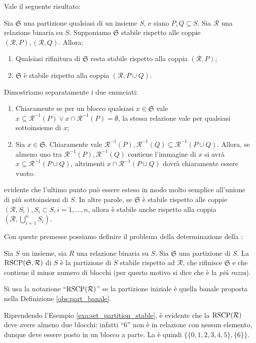 Vale il seguente risultato:
\begin{proposition}
    \label{prop:rifi_stabile}
    Sia $\mathfrak{S}$ una partizione qualsiasi di un insieme $S$, e siano $P,Q \subseteq S$. Sia $\mathcal{R}$ una relazione binaria su $S$. Supponiamo $\mathfrak{S}$ stabile rispetto alle coppie $(\mathcal{R},P),(\mathcal{R},Q)$. Allora:
    \begin{enumerate}
        \item Qualsiasi rifinitura di $\mathfrak{S}$ resta stabile rispetto alla coppia $(\mathcal{R},P)$;
        \item $\mathfrak{S}$ è stabile rispetto alla coppia $(\mathcal{R},P \cup Q)$.
    \end{enumerate}
\end{proposition}
\begin{proof2}
    Dimostriamo separatamente i due enunciati:
    \begin{enumerate}
        \item Chiaramente se per un blocco qualsiasi $x \in \mathfrak{S}$ vale $x \subseteq \mathcal{R}^{-1}(P) \lor x \cap \mathcal{R}^{-1}(P) = \emptyset$, la stessa relazione vale per qualsiasi sottoinsieme di $x$;
        \item Sia $x \in \mathfrak{S}$. Chiaramente vale $\mathcal{R}^{-1}(P),\mathcal{R}^{-1}(Q) \subseteq \mathcal{R}^{-1}(P \cup Q)$. Allora, se almeno uno tra $\mathcal{R}^{-1}(P),\mathcal{R}^{-1}(Q)$ contiene l'immagine di $x$ si avrà $x \subseteq \mathcal{R}^{-1}(P \cup Q)$, altrimenti $x \cap \mathcal{R}^{-1}(P \cup Q)$ dovrà chiaramente essere vuoto.
    \end{enumerate}
    \vspace*{-0.75cm}
\end{proof2}

\accente evidente che l'ultimo punto può essere esteso in modo molto semplice all'unione di più sottoinsiemi di $S$. In altre parole, se $\mathfrak{S}$ è stabile rispetto alle coppie $(\mathcal{R},S_i), S_i \subset S, i = 1, \dots, n$, allora è stabile anche rispetto alla coppia $(\mathcal{R}, \bigcup_{i=1}^{n} S_i)$.

Con queste premesse possiamo definire il problema della determinazione della \rscp:
\begin{definition}
    Sia $S$ un insieme, sia $R$ una relazione binaria su $S$. Sia $\mathfrak{S}$ una partizione di $S$. La $\textup{RSCP}(\mathfrak{S},\mathcal{R})$ di $S$ è la partizione di $S$ stabile rispetto ad $\mathcal{R}$, che rifinisce $\mathfrak{S}$ e che contiene il minor numero di blocchi (per questo motivo si dice che è la \emph{più rozza}).

    Si usa la notazione ``$\textup{RSCP}(\mathcal{R})$'' se la partizione iniziale è quella banale proposta nella Definizione \ref{obs:part_banale}.
\end{definition}
\begin{example}
    Riprendendo l'Esempio \ref*{exa:set_partition_stable}, è evidente che la $\textup{RSCP}(\mathcal{R})$ deve avere almeno due blocchi: infatti ``6'' non è in relazione con nessun elemento, dunque deve essere posto in un blocco a parte. La \rscp è quindi $\{\{0,1,2,3,4,5\},\{6\}\}$.
\end{example}

